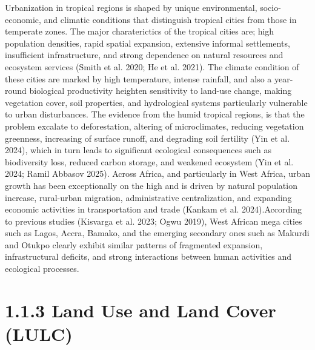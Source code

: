 Urbanization in tropical regions is shaped by unique environmental, socio-economic, and climatic conditions that distinguish tropical cities from those in temperate zones. The major charaterictics of the tropical cities are; high population densities, rapid spatial expansion, extensive informal settlements, insufficient infrastructure, and strong dependence on natural resources and ecosystem services (Smith et al. 2020; He et al. 2021). The climate condition of these cities are marked by high temperature, intense rainfall, and also a year-round biological productivity heighten sensitivity to land-use change, making vegetation cover, soil properties, and hydrological systems particularly vulnerable to urban disturbances. The evidence from the humid tropical regions, is that the problem excalate to deforestation, altering of microclimates, reducing vegetation greenness, increasing of surface runoff, and degrading soil fertility (Yin et al. 2024), which in turn leads to significant ecological consequences such as biodiversity loss, reduced carbon storage, and weakened ecosystem (Yin et al. 2024; Ramil Abbasov 2025).
Across Africa, and particularly in West Africa, urban growth has been exceptionally on the high and is driven by natural population increase, rural-urban migration, administrative centralization, and expanding economic activities in transportation and trade (Kankam et al. 2024).According to previous studies (Kisvarga et al. 2023; Ogwu 2019), West African mega cities such as Lagos, Accra, Bamako, and the emerging secondary ones such as Makurdi and Otukpo clearly exhibit similar patterns of fragmented expansion, infrastructural deficits, and strong interactions between human activities and ecological processes.
\hypertarget{land-use-and-land-cover-lulc}{%
\section{\texorpdfstring{\textbf{1.1.3 Land Use and Land Cover (LULC)}}{1.1.3 Land Use and Land Cover (LULC)}}\label{land-use-and-land-cover-lulc}}

